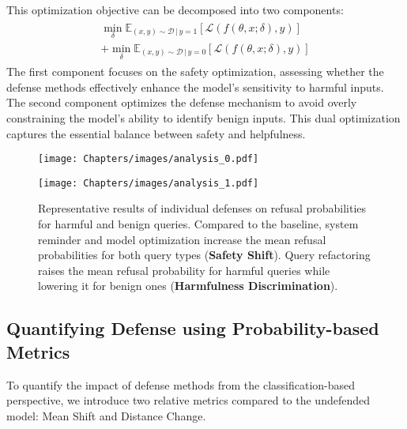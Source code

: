 This optimization objective can be decomposed into two components:
\begin{align*}
\begin{split}
\min_{\delta} \mathbb{E}_{(x, y) \sim \mathcal{D} \, | \, y = 1} \left[ \mathcal{L}(f(\theta, x; \delta), y) \right] \\
+ \min_{\delta} \mathbb{E}_{(x, y) \sim \mathcal{D} \, | \, y = 0} \left[ \mathcal{L}(f(\theta, x; \delta), y) \right]
\end{split}
\end{align*}
The first component focuses on the safety optimization, assessing whether the defense methods effectively enhance the model’s sensitivity to harmful inputs. The second component optimizes the defense mechanism to avoid overly constraining the model’s ability to identify benign inputs. This dual optimization captures the essential balance between safety and helpfulness.

\begin{figure*}[ht]
    \centering
    \begin{minipage}{0.33\textwidth} 
        \texttt{[image: Chapters/images/analysis\_0.pdf]}
    \end{minipage}\hfill 
    \begin{minipage}{0.62\textwidth} 
        \texttt{[image: Chapters/images/analysis\_1.pdf]}
    \end{minipage}
    \caption{Representative results of individual defenses on refusal probabilities for harmful and benign queries. Compared to the baseline, system reminder and model optimization increase the mean refusal probabilities for both query types (\textbf{Safety Shift}). Query refactoring raises the mean refusal probability for harmful queries while lowering it for benign ones (\textbf{Harmfulness Discrimination}).}
    \label{fig:analysis results}
\end{figure*}

\subsection{Quantifying Defense using Probability-based Metrics}
\label{sec:defense_effects}
To quantify the impact of defense methods from the classification-based perspective, we introduce two relative metrics compared to the undefended model: Mean Shift and Distance Change.

